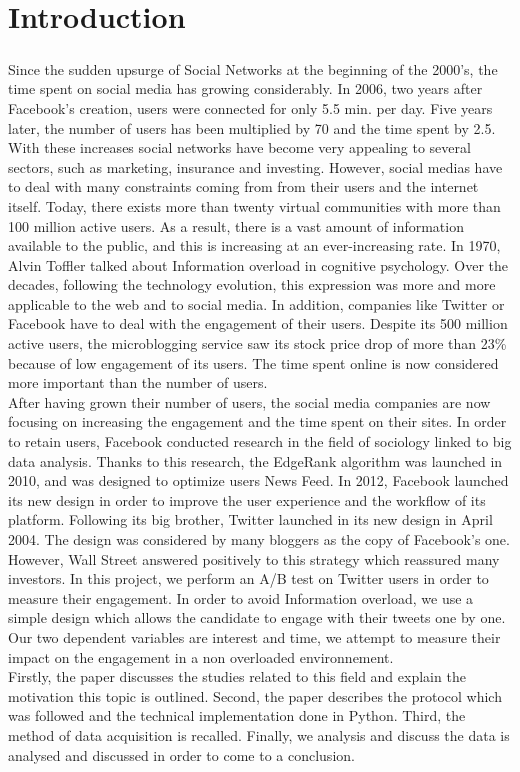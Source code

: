 \chapter*{Introduction}

\paragraph{}
Since the sudden upsurge of Social Networks at the beginning of the 2000's, the time spent on social media
has growing considerably. In 2006, two years after Facebook's creation, users were connected for only 5.5
min. per day. Five years later, the number of users has been multiplied by 70 and the time spent by 2.5. With
these increases social networks have become very appealing to several sectors, such as marketing,
insurance and investing. However, social medias have to deal with many constraints coming from from their
users and the internet itself. Today, there exists more than twenty virtual communities with more than 100
million active users. As a result, there is a vast amount of information available to the public, and this is
increasing at an ever-increasing rate. In 1970, Alvin Toffler talked about Information overload in cognitive
psychology. Over the decades, following the technology evolution, this expression was more and more
applicable to the web and to social media. In addition, companies like Twitter or Facebook have to deal with
the engagement of their users. Despite its 500 million active users, the microblogging service saw its stock
price drop of more than 23\% because of low engagement of its users. The time spent online is now
considered more important than the number of users.\\
After having grown their number of users, the social media companies are now focusing on increasing the
engagement and the time spent on their sites. In order to retain users, Facebook conducted research in the
field of sociology linked to big data analysis. Thanks to this research, the EdgeRank algorithm was launched
in 2010, and was designed to optimize users News Feed. In 2012, Facebook launched its new design in
order to improve the user experience and the workflow of its platform. Following its big brother, Twitter
launched in its new design in April 2004. The design was considered by many bloggers as the copy of
Facebook's one. However, Wall Street answered positively to this strategy which reassured many investors.
In this project, we perform an A/B test on Twitter users in order to measure their engagement. In order to
avoid Information overload, we use a simple design which allows the candidate to engage with their tweets
one by one. Our two dependent variables are interest and time, we attempt to measure their impact on the
engagement in a non overloaded environnement.\\
Firstly, the paper discusses the studies related to this field and explain the motivation this topic is outlined.
Second, the paper describes the protocol which was followed and the technical implementation done in
Python. Third, the method of data acquisition is recalled. Finally, we analysis and discuss the data is
analysed and discussed in order to come to a conclusion.

